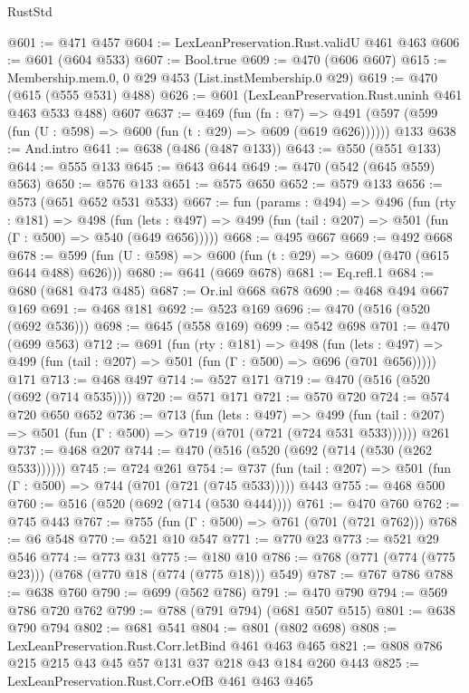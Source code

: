 \begin{lexlean}{RustStd}
\begin{coremodule}
@601 := @471 @457
@604 := LexLeanPreservation.Rust.validU @461 @463
@606 := @601 (@604 @533)
@607 := Bool.true
@609 := @470 (@606 @607)
@615 := Membership.mem.{0, 0} @29 @453 (List.instMembership.{0} @29)
@619 := @470 (@615 (@555 @531) @488)
@626 := @601 (LexLeanPreservation.Rust.uninh @461 @463 @533 @488) @607
@637 := @469
    (fun (fn : @7) =>
    @491 (@597 (@599 (fun (U : @598) => @600 (fun (t : @29) => @609 (@619 @626))))))
    @133
@638 := And.intro
@641 := @638 (@486 (@487 @133))
@643 := @550 (@551 @133)
@644 := @555 @133
@645 := @643 @644
@649 := @470 (@542 (@645 @559) @563)
@650 := @576 @133
@651 := @575 @650
@652 := @579 @133
@656 := @573 (@651 @652 @531 @533)
@667 := fun (params : @494) =>
  @496
    (fun (rty : @181) =>
    @498
      (fun (lets : @497) => @499 (fun (tail : @207) => @501 (fun (Γ : @500) => @540 (@649 @656)))))
@668 := @495 @667
@669 := @492 @668
@678 := @599 (fun (U : @598) => @600 (fun (t : @29) => @609 (@470 (@615 @644 @488) @626)))
@680 := @641 (@669 @678)
@681 := Eq.refl.{1}
@684 := @680 (@681 @473 @485)
@687 := Or.inl @668 @678
@690 := @468 @494 @667 @169
@691 := @468 @181
@692 := @523 @169
@696 := @470 (@516 (@520 (@692 @536)))
@698 := @645 (@558 @169)
@699 := @542 @698
@701 := @470 (@699 @563)
@712 := @691
    (fun (rty : @181) =>
    @498
      (fun (lets : @497) => @499 (fun (tail : @207) => @501 (fun (Γ : @500) => @696 (@701 @656)))))
    @171
@713 := @468 @497
@714 := @527 @171
@719 := @470 (@516 (@520 (@692 (@714 @535))))
@720 := @571 @171
@721 := @570 @720
@724 := @574 @720 @650 @652
@736 := @713
    (fun (lets : @497) =>
    @499 (fun (tail : @207) => @501 (fun (Γ : @500) => @719 (@701 (@721 (@724 @531 @533))))))
    @261
@737 := @468 @207
@744 := @470 (@516 (@520 (@692 (@714 (@530 (@262 @533))))))
@745 := @724 @261
@754 := @737 (fun (tail : @207) => @501 (fun (Γ : @500) => @744 (@701 (@721 (@745 @533))))) @443
@755 := @468 @500
@760 := @516 (@520 (@692 (@714 (@530 @444))))
@761 := @470 @760
@762 := @745 @443
@767 := @755 (fun (Γ : @500) => @761 (@701 (@721 @762)))
@768 := @6 @548
@770 := @521 @10 @547
@771 := @770 @23
@773 := @521 @29 @546
@774 := @773 @31
@775 := @180 @10
@786 := @768 (@771 (@774 (@775 @23))) (@768 (@770 @18 (@774 (@775 @18))) @549)
@787 := @767 @786
@788 := @638 @760
@790 := @699 (@562 @786)
@791 := @470 @790
@794 := @569 @786 @720 @762
@799 := @788 (@791 @794) (@681 @507 @515)
@801 := @638 @790 @794
@802 := @681 @541
@804 := @801 (@802 @698)
@808 := LexLeanPreservation.Rust.Corr.letBind @461 @463 @465
@821 := @808 @786 @215 @215 @43 @45 @57 @131 @37 @218 @43 @184 @260 @443
@825 := LexLeanPreservation.Rust.Corr.eOfB @461 @463 @465

\end{coremodule}
\end{lexlean}

